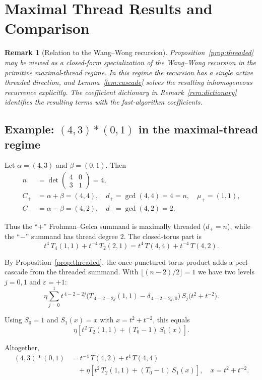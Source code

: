 \documentclass[12pt]{article}
\newtheorem{remark}[theorem]{Remark}
\begin{document}
\section{Maximal Thread Results and Comparison}\label{app:ww-example}

\begin{remark}[Relation to the Wang--Wong recursion]
Proposition~\ref{prop:threaded} may be viewed as a closed-form specialization of the Wang--Wong recursion in the primitive maximal-thread regime. In this regime the recursion has a single active threaded direction, and Lemma~\ref{lem:cascade} solves the resulting inhomogeneous recurrence explicitly. The coefficient dictionary in Remark~\ref{rem:dictionary} identifies the resulting terms with the fast-algorithm coefficients.
\end{remark}

\subsection*{Example: \texorpdfstring{$(4,3)\ast(0,1)$}{(4,3)\ast(0,1)} in the maximal-thread regime}

Let $\alpha=(4,3)$ and $\beta=(0,1)$. Then
\begin{align}
n &= \det\!\begin{pmatrix}4&0\\ 3&1\end{pmatrix} = 4, \\
C_{+} &= \alpha+\beta = (4,4), \quad d_{+} = \gcd(4,4) = 4 = n, \quad \mu_{+} = (1,1), \\
C_{-} &= \alpha-\beta = (4,2), \quad d_{-} = \gcd(4,2) = 2.
\end{align}

Thus the ``$+$'' Frohman--Gelca summand is maximally threaded ($d_{+}=n$), while the ``$-$'' summand has thread degree $2$. The closed-torus part is
\[
t^{4}\,T_{4}(1,1) + t^{-4}\,T_{2}(2,1) = t^{4}\,T(4,4) + t^{-4}\,T(4,2).
\]

By Proposition~\ref{prop:threaded}, the once-punctured torus product adds a peel-cascade from the threaded summand. With $\lfloor(n-2)/2\rfloor=1$ we have two levels $j=0,1$ and $\varepsilon=+1$:
\[
\eta\!\sum_{j=0}^{1} t^{\,4-2-2j}
\Big(T_{\,4-2-2j}(1,1)-\delta_{\,4-2-2j,0}\Big)\,S_j\!\big(t^{2}+t^{-2}\big).
\]

Using $S_{0}=1$ and $S_{1}(x)=x$ with $x=t^{2}+t^{-2}$, this equals
\[
\eta\left[ t^{2}\,T_{2}(1,1) + (T_{0}-1)\,S_1(x)\right].
\]

Altogether,
\begin{align}
(4,3)\ast(0,1) &= t^{-4}\,T(4,2) + t^{4}\,T(4,4) \nonumber \\
&\quad + \eta\left[ t^{2}\,T_{2}(1,1) + (T_{0}-1)\,S_1(x)\right], \quad x=t^{2}+t^{-2}.
\end{align}
\end{document}
